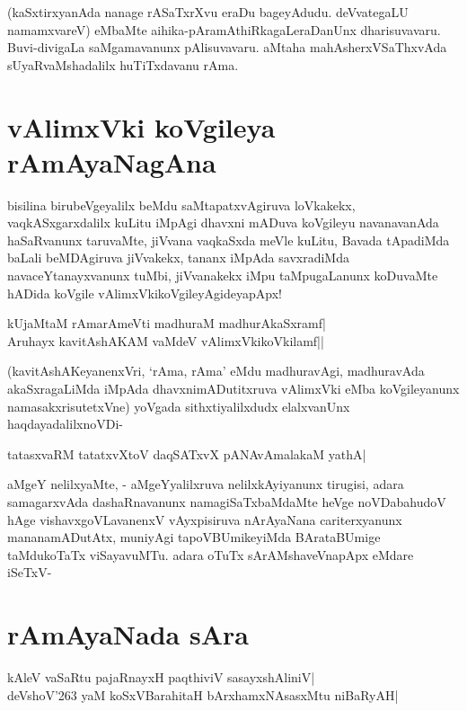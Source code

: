 (kaSxtirxyanAda nanage rASaTxrXvu eraDu bageyAdudu. deVvategaLU namamxvareV) eMbaMte aihika-pAramAthiRkagaLeraDanUnx dharisuvavaru. Buvi-divigaLa saMgamavanunx pAlisuvavaru. aMtaha mahAsherxVSaThxvAda sUyaRvaMshadalilx huTiTxdavanu rAma. 

\section*{vAlimxVki koVgileya rAmAyaNagAna} 

bisilina birubeVgeyalilx beMdu saMtapatxvAgiruva loVkakekx, vaqkASxgarxdalilx kuLitu iMpAgi dhavxni mADuva koVgileyu navanavanAda haSaRvanunx taruvaMte, jiVvana vaqkaSxda meVle kuLitu, Bavada tApadiMda baLali beMDAgiruva jiVvakekx, tananx iMpAda savxradiMda navaceYtanayxvanunx tuMbi, jiVvanakekx iMpu taMpugaLanunx koDuvaMte hADida koVgile vAlimxVkikoVgileyAgideyapApx! 

\begin{shloka} 
kUjaMtaM rAmarAmeVti madhuraM madhurAkaSxramf|\label{148}\\ 
Aruhayx kavitAshAKAM vaMdeV vAlimxVkikoVkilamf||
\end{shloka} 

(kavitAshAKeyanenxVri, `rAma, rAma' eMdu madhuravAgi, madhuravAda akaSxragaLiMda iMpAda dhavxnimADutitxruva vAlimxVki eMba koVgileyanunx namasakxrisutetxVne) yoVgada sithxtiyalilxdudx elalxvanUnx haqdayadalilxnoVDi- 

\begin{shloka} 
tatasxvaRM tatatxvXtoV daqSATxvX pANAvAmalakaM yathA|\label{149}
\end{shloka}

aMgeY nelilxyaMte, - aMgeYyalilxruva nelilxkAyiyanunx tirugisi, adara samagarxvAda dashaRnavanunx namagiSaTxbaMdaMte heVge noVDabahudoV hAge vishavxgoVLavanenxV vAyxpisiruva nArAyaNana cariterxyanunx mananamADutAtx, muniyAgi tapoVBUmikeyiMda BArataBUmige taMdukoTaTx viSayavuMTu. adara oTuTx sArAMshaveVnapApx eMdare iSeTxV- 

\section*{rAmAyaNada sAra} 

\begin{shloka} 
kAleV vaSaRtu pajaRnayxH paqthiviV sasayxshAliniV|\label{149a}\\ 
deVshoV\char'263 yaM koSxVBarahitaH bArxhamxNAsasxMtu niBaRyAH|
\end{shloka} 

